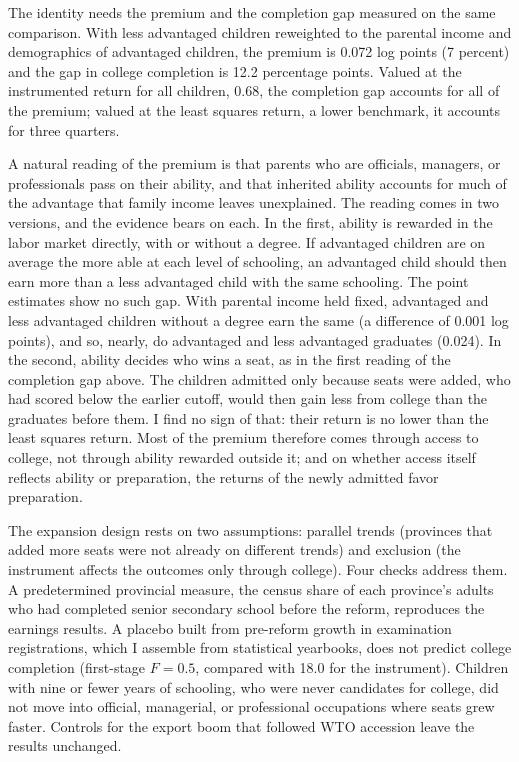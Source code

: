 \documentclass[11pt]{article}
\begin{document}
The identity needs the premium and the completion gap measured on the same comparison. With less advantaged children reweighted to the parental income and demographics of advantaged children, the premium is 0.072 log points (7 percent) and the gap in college completion is 12.2 percentage points. Valued at the instrumented return for all children, 0.68, the completion gap accounts for all of the premium; valued at the least squares return, a lower benchmark, it accounts for three quarters.

A natural reading of the premium is that parents who are officials, managers, or professionals pass on their ability, and that inherited ability accounts for much of the advantage that family income leaves unexplained. The reading comes in two versions, and the evidence bears on each. In the first, ability is rewarded in the labor market directly, with or without a degree. If advantaged children are on average the more able at each level of schooling, an advantaged child should then earn more than a less advantaged child with the same schooling. The point estimates show no such gap. With parental income held fixed, advantaged and less advantaged children without a degree earn the same (a difference of 0.001 log points), and so, nearly, do advantaged and less advantaged graduates (0.024). In the second, ability decides who wins a seat, as in the first reading of the completion gap above. The children admitted only because seats were added, who had scored below the earlier cutoff, would then gain less from college than the graduates before them. I find no sign of that: their return is no lower than the least squares return. Most of the premium therefore comes through access to college, not through ability rewarded outside it; and on whether access itself reflects ability or preparation, the returns of the newly admitted favor preparation.

The expansion design rests on two assumptions: parallel trends (provinces that added more seats were not already on different trends) and exclusion (the instrument affects the
outcomes only through college). Four checks address them. A predetermined provincial measure, the census share of each province's adults who had
completed senior secondary school before the reform, reproduces the earnings results. A placebo built from pre-reform growth in examination
registrations, which I assemble from statistical yearbooks, does not predict
college completion (first-stage $F = 0.5$, compared with 18.0 for the instrument). Children with nine or fewer years
of schooling, who were never candidates for college, did not move into official, managerial, or professional occupations where seats grew faster. Controls for the export boom that followed
WTO accession leave the results unchanged.
\end{document}
